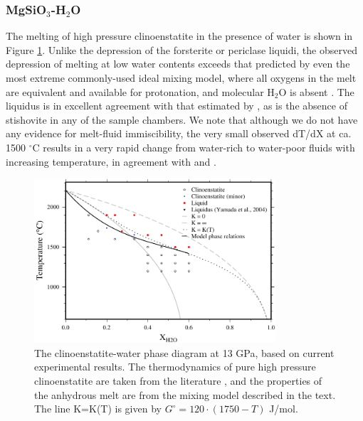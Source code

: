 \documentclass[review]{elsarticle}
\begin{document}
\subsubsection{MgSiO$_3$-H$_2$O}
The melting of high pressure clinoenstatite in the presence of water is shown in Figure \ref{fig:eoH}. Unlike the depression of the forsterite or periclase liquidi, the observed depression of melting at low water contents exceeds that predicted by even the most extreme commonly-used ideal mixing model, where all oxygens in the melt are equivalent and available for protonation, and molecular H$_2$O is absent \citep{SS1985}. The liquidus is in excellent agreement with that estimated by \cite{YII2004}, as is the absence of stishovite in any of the sample chambers. We note that although we do not have any evidence for melt-fluid immiscibility, the very small observed dT/dX at ca. 1500 $^{\circ}$C results in a very rapid change from water-rich to water-poor fluids with increasing temperature, in agreement with \cite{Inoue1994} and \cite{YII2004}.

\begin{figure}[ht!]
  \centering
      \includegraphics[width=0.8\textwidth]{figures/enstatite}
  \caption{The clinoenstatite-water phase diagram at 13 GPa, based on current experimental results. The thermodynamics of pure high pressure clinoenstatite are taken from the literature \citep{SLB2011}, and the properties of the anhydrous melt are from the mixing model described in the text. The line K=K(T) is given by $G^{\circ} = 120 \cdot (1750-T)$ J/mol.}
  \label{fig:eoH}
\end{figure}

\clearpage
\end{document}
